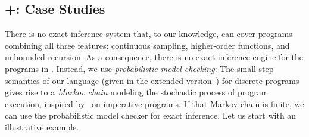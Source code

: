 \subsection{\Slicebf+\Stormbf: Case Studies}\label{sec:case-studies}
%
There is no exact inference system that, to our knowledge, can cover programs combining all three features: continuous sampling, higher-order functions, and unbounded recursion. As a consequence, there is no exact inference engine for the programs in . Instead, we use \emph{probabilistic model checking}: The small-step semantics of our language (given in the extended version~\cite[Tables~1 and~2]{Wu2026SliceExtended}) for discrete programs gives rise to a \emph{Markov chain} modeling the  stochastic process of program execution, inspired by~\cite{Jansen2016BoundedModelCheckingProbPrograms} on imperative programs. If that Markov chain is finite, we can use the probabilistic model checker \Storm \cite{storm} for exact inference. Let us start with an illustrative example.


%


